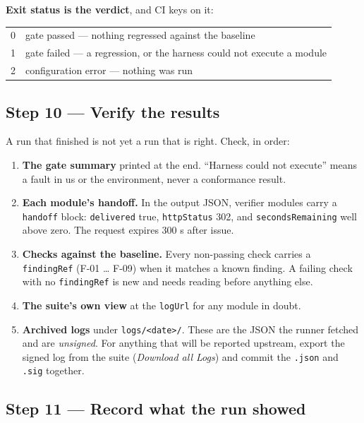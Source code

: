 \documentclass[10pt,a4paper]{article}
\newcommand{\tightlist}{\setlength{\itemsep}{1pt}\setlength{\parskip}{0pt}\setlength{\parsep}{0pt}}
\begin{document}
\textbf{Exit status is the verdict}, and CI keys on it:

\begin{tabular}{@{}ll@{}}
0 & gate passed --- nothing regressed against the baseline\\
1 & gate failed --- a regression, or the harness could not execute a module\\
2 & configuration error --- nothing was run\\
\end{tabular}

\subsection{Step 10 --- Verify the results}

A run that finished is not yet a run that is right. Check, in order:

\begin{enumerate}\tightlist
  \item \textbf{The gate summary} printed at the end. ``Harness could not execute''
        means a fault in us or the environment, never a conformance result.
  \item \textbf{Each module's handoff.} In the output JSON, verifier modules carry a
        \texttt{handoff} block: \texttt{delivered} true, \texttt{httpStatus} 302, and
        \texttt{secondsRemaining} well above zero. The request expires 300 s after issue.
  \item \textbf{Checks against the baseline.} Every non-passing check carries a
        \texttt{findingRef} (F-01 \ldots{} F-09) when it matches a known finding. A failing
        check with no \texttt{findingRef} is new and needs reading before anything else.
  \item \textbf{The suite's own view} at the \texttt{logUrl} for any module in doubt.
  \item \textbf{Archived logs} under \texttt{logs/<date>/}. These are the JSON the runner
        fetched and are \emph{unsigned}. For anything that will be reported upstream,
        export the signed log from the suite (\emph{Download all Logs}) and commit the
        \texttt{.json} and \texttt{.sig} together.
\end{enumerate}

\subsection{Step 11 --- Record what the run showed}
\end{document}
